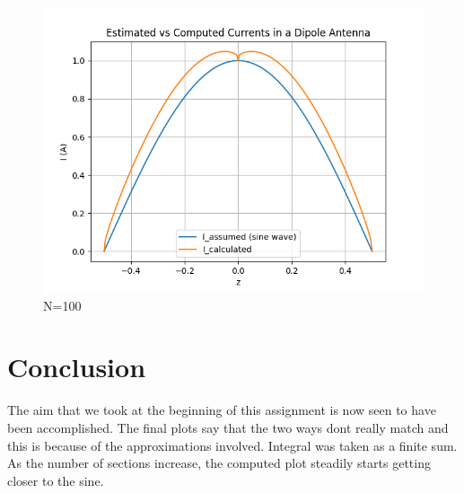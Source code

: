 \documentclass[11pt, a4paper]{article}
\begin{document}
\begin{figure}[!tbh]
   	\centering
  \includegraphics[scale=0.5]{f2.png} 
    \caption{N=100} 	
\end{figure}  

\section{Conclusion}
The aim that we took at the beginning of this assignment is now seen to have been accomplished. The final plots say that the two ways dont really match and this is because of the approximations involved. Integral was taken as a finite sum. As the number of sections increase, the computed plot steadily starts getting closer to the sine. 
\end{document}
